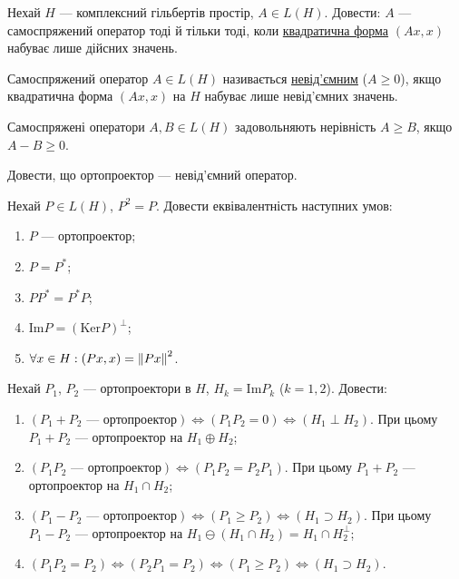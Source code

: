 \begin{exercise}
    Нехай $H$ --- комплексний гільбертів простір, $A \in L(H)$. Довести: 
    $A$ --- самоспряжений оператор тоді й тільки тоді, коли 
    \uline{квадратична форма} $(Ax, x)$ набуває лише дійсних значень.
\end{exercise}

\begin{theory}
    Самоспряжений оператор $A \in L(H)$ називається \uline{невід'ємним} ($A \geq 0$),
    якщо квадратична форма $(Ax, x)$ на $H$ набуває лише невід'ємних значень.

    Самоспряжені оператори $A, B \in L(H)$ задовольняють нерівність $A \geq B$, якщо $A - B \geq 0$.
\end{theory}

\begin{exercise}
    Довести, що ортопроектор --- невід'ємний оператор.
\end{exercise}

\begin{exercise}
    Нехай $P \in L(H)$, $P^2 = P$. Довести еквівалентність наступних умов:
    \begin{enumerate}[label=\ukr*)]
        \item $P$ --- ортопроектор;
        \item $P = P^*$;
        \item $P P^* = P^* P$;
        \item $\mathrm{Im} P = (\mathrm{Ker} P)^\perp$;
        \item $\forall x \in H: (Px, x) = \left\lVert Px\right\rVert^2$.
    \end{enumerate}
\end{exercise}

\begin{exercise}\label{N:1_3_18}
    Нехай $P_1$, $P_2$ --- ортопроектори в $H$, $H_k = \mathrm{Im} P_k$ ($k = 1, 2$).
    Довести:
    \begin{enumerate}[label=\ukr*)]
        \item\label{N:1_3_18_a} $(P_1 + P_2 \text{ --- ортопроектор}) \Leftrightarrow (P_1 P_2 = 0) \Leftrightarrow (H_1 \perp H_2)$.
        При цьому $P_1 + P_2$ --- ортопроектор на $H_1 \oplus H_2$;
        \item $(P_1 P_2 \text{ --- ортопроектор}) \Leftrightarrow (P_1 P_2 = P_2 P_1)$.
        При цьому $P_1 + P_2$ --- ортопроектор на $H_1 \cap H_2$;
        \item $(P_1 - P_2 \text{ --- ортопроектор}) \Leftrightarrow (P_1 \geq P_2) \Leftrightarrow (H_1 \supset H_2)$.
        При цьому $P_1 - P_2$ --- ортопроектор на $H_1 \ominus (H_1 \cap H_2) = H_1 \cap H_2^\perp$;
        \item $(P_1 P_2 = P_2) \Leftrightarrow (P_2 P_1 = P_2) \Leftrightarrow (P_1 \geq P_2) \Leftrightarrow (H_1 \supset H_2)$.
    \end{enumerate}
\end{exercise}

